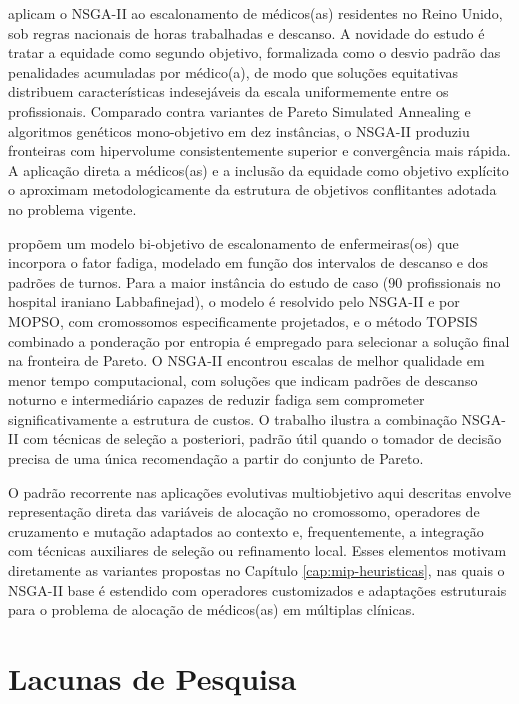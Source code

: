  aplicam o NSGA-II ao escalonamento de médicos(as) residentes no Reino Unido, sob regras nacionais de horas trabalhadas e descanso. A novidade do estudo é tratar a equidade como segundo objetivo, formalizada como o desvio padrão das penalidades acumuladas por médico(a), de modo que soluções equitativas distribuem características indesejáveis da escala uniformemente entre os profissionais. Comparado contra variantes de Pareto Simulated Annealing e algoritmos genéticos mono-objetivo em dez instâncias, o NSGA-II produziu fronteiras com hipervolume consistentemente superior e convergência mais rápida. A aplicação direta a médicos(as) e a inclusão da equidade como objetivo explícito o aproximam metodologicamente da estrutura de objetivos conflitantes adotada no problema vigente.

 propõem um modelo bi-objetivo de escalonamento de enfermeiras(os) que incorpora o fator fadiga, modelado em função dos intervalos de descanso e dos padrões de turnos. Para a maior instância do estudo de caso (90 profissionais no hospital iraniano Labbafinejad), o modelo é resolvido pelo NSGA-II e por MOPSO, com cromossomos especificamente projetados, e o método TOPSIS combinado a ponderação por entropia é empregado para selecionar a solução final na fronteira de Pareto. O NSGA-II encontrou escalas de melhor qualidade em menor tempo computacional, com soluções que indicam padrões de descanso noturno e intermediário capazes de reduzir fadiga sem comprometer significativamente a estrutura de custos. O trabalho ilustra a combinação NSGA-II com técnicas de seleção a posteriori, padrão útil quando o tomador de decisão precisa de uma única recomendação a partir do conjunto de Pareto.

O padrão recorrente nas aplicações evolutivas multiobjetivo aqui descritas envolve representação direta das variáveis de alocação no cromossomo, operadores de cruzamento e mutação adaptados ao contexto e, frequentemente, a integração com técnicas auxiliares de seleção ou refinamento local. Esses elementos motivam diretamente as variantes propostas no Capítulo \ref{cap:mip-heuristicas}, nas quais o NSGA-II base é estendido com operadores customizados e adaptações estruturais para o problema de alocação de médicos(as) em múltiplas clínicas.

\section{Lacunas de Pesquisa}

